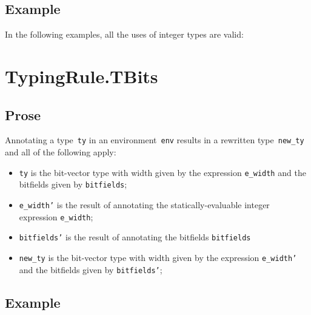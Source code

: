 \documentclass{book}
\begin{document}
\begin{itemize}
\subsection{Example}

In the following examples, all the uses of integer types are valid:





\section{TypingRule.TBits \label{sec:TypingRule.TBits}}

\subsection{Prose}
Annotating a type~\texttt{ty} in an environment~\texttt{env} results in a
rewritten type~\texttt{new\_ty} and all of the following apply:
\begin{itemize}
  \item \texttt{ty} is the bit-vector type with width given by the expression
    \texttt{e\_width} and the bitfields given by \texttt{bitfields};
  \item \texttt{e\_width'} is the result of annotating the statically-evaluable integer expression \texttt{e\_width};
  \item \texttt{bitfields'} is the result of annotating the bitfields \texttt{bitfields}
  \item \texttt{new\_ty} is the bit-vector type with width given by the expression
    \texttt{e\_width'} and the bitfields given by \texttt{bitfields'};
\end{itemize}

\subsection{Example}




\end{itemize}
\end{document}
